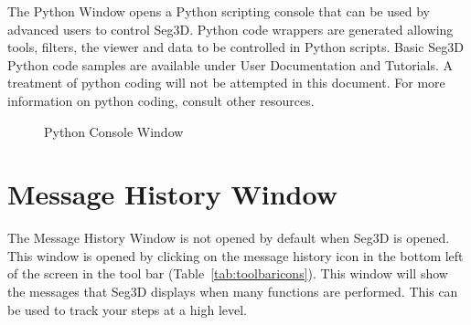 \documentclass[fleqn,11pt,openany]{book}
\begin{document}
The Python Window opens a Python scripting console that can be used by advanced users to control Seg3D.
Python code wrappers are generated allowing tools, filters, the viewer and data to be controlled in Python scripts. 
Basic Seg3D Python code samples are available under User Documentation and Tutorials.
A treatment of python coding will not be attempted in this document.
For more information on python coding, consult other resources.

\begin{figure}[h]
\caption{Python Console Window}\label{fig:PythonConsole}
\end{figure}

\section{Message History Window}
\label{sec:messagehistory}
The Message History Window is not opened by default when Seg3D is opened.  This window is opened by clicking on the message history icon in the bottom left of the screen in the tool bar (Table~\ref{tab:toolbaricons}).    This window will show the messages that Seg3D displays when many functions are performed.  This can be used to track your steps at a high level.  


\end{document}
